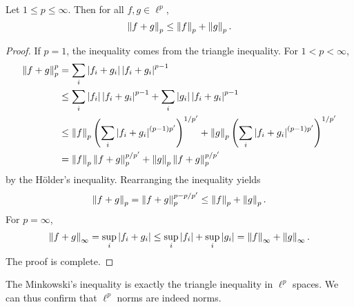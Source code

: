 \begin{theorem}
    Let $1\leq p\leq\infty$. Then for all $f,g\in\ell^p$, 
    \begin{equation*}
        \left\lVert {f+g} \right\rVert_p \leq \left\lVert {f} \right\rVert_p + \left\lVert {g} \right\rVert_p.
    \end{equation*}
\end{theorem}
\begin{proof}
    If $p = 1$, the inequality comes from the triangle inequality. 
    For $1<p<\infty$, 
    \begin{equation*}
        \begin{split}
            \norm{f+g}_p^p &= \sum_i \abs{f_i+g_i}\abs{f_i+g_i}^{p-1} \\
            &\leq \sum_i \abs{f_i}\abs{f_i+g_i}^{p-1} + \sum_i \abs{g_i}\abs{f_i+g_i}^{p-1} \\
            &\leq \norm{f}_p\pth{\sum_i \abs{f_i+g_i}^{(p-1)p'}}^{1/p'} + \norm{g}_p\pth{\sum_i \abs{f_i+g_i}^{(p-1)p'}}^{1/p'} \\ 
            &= \norm{f}_p\norm{f+g}_p^{p/p'} + \norm{g}_p\norm{f+g}_p^{p/p'}
        \end{split}
    \end{equation*}
    by the H\"older's inequality. Rearranging the inequality yields 
    \begin{equation*}
        \left\lVert {f+g} \right\rVert_p = \left\lVert {f+g} \right\rVert_p^{p-p/p'} \leq \left\lVert {f} \right\rVert_p + \left\lVert {g} \right\rVert_p.
    \end{equation*}
    For $p = \infty$, 
    \begin{equation*}
        \left\lVert {f+g} \right\rVert_\infty = \sup_i\left\lvert {f_i+g_i} \right\rvert \leq \sup_i\left\lvert {f_i} \right\rvert + \sup_i\left\lvert {g_i} \right\rvert = \left\lVert {f} \right\rVert_\infty + \left\lVert {g} \right\rVert_\infty.
    \end{equation*}
    The proof is complete.
\end{proof}
\begin{remark}
    The Minkowski's inequality is exactly the triangle inequality 
    in $\ell^p$ spaces. We can thus confirm that $\ell^p$ norms 
    are indeed norms.
\end{remark}